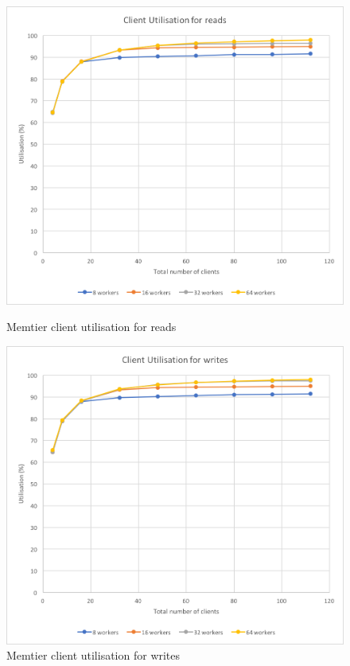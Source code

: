 \documentclass[11pt,a4paper]{article}
\begin{document}
\begin{figure}[!h]
    \centering
    \begin{minipage}[b]{.45\textwidth}
        \centering
        \includegraphics[width=\textwidth]{processing/graphics/q_network_clt_util_1mw_reads.png}
        \caption{Memtier client utilisation for reads}
        \label{png::q_network_clt_util_1mw_reads}
    \end{minipage}
    \qquad
    \begin{minipage}[b]{.45\textwidth}
        \centering
        \includegraphics[width=\textwidth]{processing/graphics/q_network_clt_util_1mw_writes.png}
        \caption{Memtier client utilisation for writes}
        \label{png::q_network_clt_util_1mw_writes}
    \end{minipage}
\end{figure}
\end{document}
